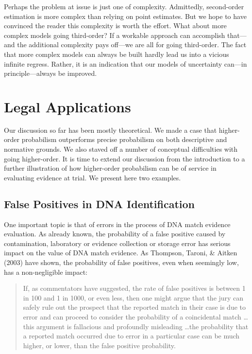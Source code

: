 \documentclass[
  10pt,
  dvipsnames,enabledeprecatedfontcommands]{scrartcl}
\newcommand{\inbook}[1]{\todo[color=gray!40]{#1}}
\begin{document}
Perhaps the problem at issue is just one of complexity. Admittedly,
second-order estimation is more complex than relying on point estimates.
But we hope to have convinced the reader this complexity is worth the
effort. What about more complex models going third-order? If a workable
approach can accomplish that---and the additional complexity pays
off---we are all for going third-order. The fact that more complex
models can always be built hardly lead us into a vicious infinite
regress. Rather, it is an indication that our models of uncertainty
can---in principle---always be improved.

\hypertarget{legal-applications}{%
\section{Legal Applications}\label{legal-applications}}

\label{sec:legal-applications}

\inbook{Add carpet evidence in the Wayne Williams case}

Our discussion so far has been mostly theoretical. We made a case that
higher-order probabilism outperforms precise probabilism on both
descriptive and normative grounds. We also staved off a number of
conceptual difficulties with going higher-order. It is time to extend
our discussion from the introduction to a further illustration of how
higher-order probabilism can be of service in evaluating evidence at
trial. We present here two examples.

\hypertarget{false-positives-in-dna-identification}{%
\subsection{False Positives in DNA
Identification}\label{false-positives-in-dna-identification}}

One important topic is that of errors in the process of DNA match
evidence evaluation. As already known, the probability of a false
positive caused by contamination, laboratory or evidence collection or
storage error has serious impact on the value of DNA match evidence. As
Thompson, Taroni, \& Aitken (2003) have shown, the probability of false
positives, even when seemingly low, has a non-negligible impact:

\begin{quote}
If, as commentators have suggested, the rate of false positives is between 1 in 100 and 1 in 1000, or even less, then one might argue that the jury can safely rule out
the prospect that the reported match in their case is due to error and can proceed to consider the probability of a coincidental match \dots this argument is fallacious and profoundly misleading \dots  the probability that a reported match occurred due to error in a particular case can be much higher, or lower, than the false positive probability. 
\end{quote}
\end{document}
